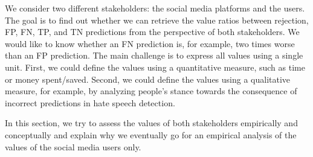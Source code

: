 %
We consider two different stakeholders: the social media platforms and the users.
%
The goal is to find out whether we can retrieve the value ratios between rejection, FP, FN, TP, and TN predictions from the perspective of both stakeholders.
%
We would like to know whether an FN prediction is, for example, two times worse than an FP prediction.
%
The main challenge is to express all values using a single unit.
%
First, we could define the values using a quantitative measure, such as time or money spent/saved.
%
Second, we could define the values using a qualitative measure, for example, by analyzing people's stance towards the consequence of incorrect predictions in hate speech detection.
%

%
In this section, we try to assess the values of both stakeholders empirically and conceptually and explain why we eventually go for an empirical analysis of the values of the social media users only.
%






